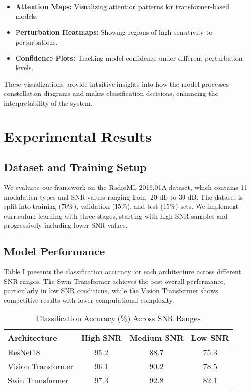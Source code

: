 \documentclass{ELSP}
\begin{document}
\begin{itemize}
    \item \textbf{Attention Maps:} Visualizing attention patterns for transformer-based models.
    \item \textbf{Perturbation Heatmaps:} Showing regions of high sensitivity to perturbations.
    \item \textbf{Confidence Plots:} Tracking model confidence under different perturbation levels.
\end{itemize}

These visualizations provide intuitive insights into how the model processes constellation diagrams and makes classification decisions, enhancing the interpretability of the system.

\section{Experimental Results}
\subsection{Dataset and Training Setup}
We evaluate our framework on the RadioML 2018.01A dataset, which contains 11 modulation types and SNR values ranging from -20 dB to 30 dB. The dataset is split into training (70\%), validation (15\%), and test (15\%) sets. We implement curriculum learning with three stages, starting with high SNR samples and progressively including lower SNR values.

\subsection{Model Performance}
Table I presents the classification accuracy for each architecture across different SNR ranges. The Swin Transformer achieves the best overall performance, particularly in low SNR conditions, while the Vision Transformer shows competitive results with lower computational complexity.

\begin{table}[h]
\caption{Classification Accuracy (\%) Across SNR Ranges}
\centering
\begin{tabular}{lccc}
\hline
\textbf{Architecture} & \textbf{High SNR} & \textbf{Medium SNR} & \textbf{Low SNR} \\
\hline
ResNet18 & 95.2 & 88.7 & 75.3 \\
Vision Transformer & 96.1 & 90.2 & 78.5 \\
Swin Transformer & 97.3 & 92.8 & 82.1 \\
\hline
\end{tabular}
\end{table}
\end{document}
